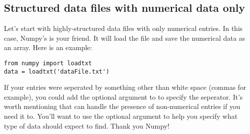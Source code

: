 \subsection*{Structured data files with numerical data only}
Let's start with highly-structured data files with only numerical entries.
In this case, Numpy's  is your friend.  It will load the
file and save the numerical data as an array.  Here is an example:
\begin{Verbatim}
from numpy import loadtxt
data = loadtxt('dataFile.txt')
\end{Verbatim}
If your entries were seperated by something other than white space
(commas for example), you could add the optional argument
 to  to specify the seperator.
It's worth mentioning that  can handle the presence of
non-numerical entries if you need it to.  You'll want to use the
optional argument  to help you specify what type of
data  should expect to find.  Thank you Numpy!

